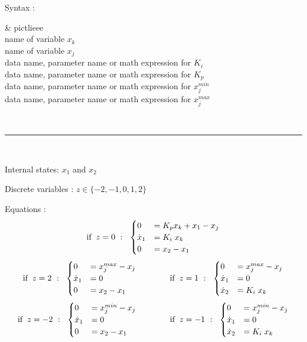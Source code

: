 \vspace{2ex}
Syntax : \hspace*{10ex}\parbox[t]{\textwidth}{\sf 
\&  pictlieee \\
name of variable $x_k$\\
name of variable $x_j$\\
data name, parameter name or math expression for $K_i$\\
data name, parameter name or math expression for $K_p$\\
data name, parameter name or math expression for $x_j^{min}$\\
data name, parameter name or math expression for $x_j^{max}$
}

~ \hrule ~

Internal states: $x_1$ and $x_2$ 

Discrete variables : $z \in \{-2,-1,0,1,2\}$

Equations :
\begin{equation*}
\mbox{if} \;\; z = 0 \mbox{\; : \;}
\begin{cases}
0 & =  K_p x_k + x_1 - x_j \\
\dot{x}_1 & =  K_i \; x_k  \\
0 & =  x_2 - x_1 
\end{cases}
\end{equation*}
\begin{equation*}
\mbox{if} \;\; z = 2 \mbox{\; : \;}
\begin{cases}
0 & =  x_j^{max} - x_j  \\
\dot{x}_1 & =  0  \\
0 & = x_2 - x_1 
\end{cases}
\mbox{\;\;\;\;\;\;\;\;\;\;\;\;\;\;if} \;\; z = 1 \mbox{\; : \;}
\begin{cases}
0 & =  x_j^{max} - x_j \\
\dot{x}_1 & = 0  \\
\dot{x}_2 & = K_i \; x_k  
\end{cases}
\end{equation*}
\begin{equation*}
\mbox{if} \;\; z = -2 \mbox{\; : \;}
\begin{cases}
0 & =  x_j^{min} - x_j  \\
\dot{x}_1 & =  0  \\
0 & = x_2 - x_1 
\end{cases}
\mbox{\;\;\;\;\;\;\;\;\;\;\;\;\;\;if} \;\; z = -1 \mbox{\; : \;}
\begin{cases}
0 & =  x_j^{min} - x_j \\
\dot{x}_1 & = 0  \\
\dot{x}_2 & = K_i \; x_k  
\end{cases}
\end{equation*}

